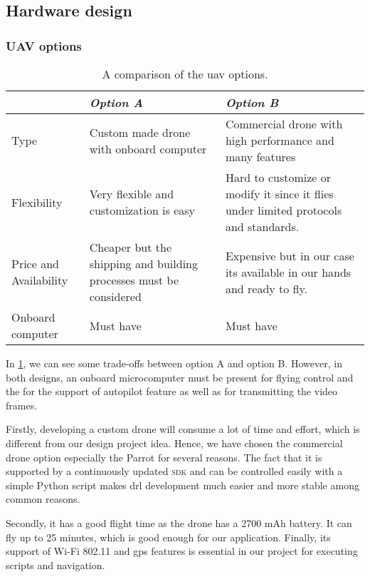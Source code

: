 \documentclass[../main.tex]{subfiles}
\begin{document}
\subsection{Hardware design}

\subsubsection{UAV options}

\begin{table}[tbp]
	\centering
	\caption{A comparison of the \gls{uav} options.}
	\label{tab:alt-solutions}
	\begin{tabularx}{\textwidth}{ p{4cm} X X }
		\toprule
		\textit{} & \textit{Option A} & \textit{Option B}\\ \midrule
		Type  & Custom made drone with onboard computer & 
		Commercial drone with high performance and many features    \\
		Flexibility & Very flexible and customization is easy & 
		Hard to customize or modify it since it flies under 
		limited protocols and standards. \\
		
		Price and Availability & Cheaper but the shipping and 
		building processes must be considered & Expensive but 
		in our case its available in our hands and ready to fly.   \\
		
		Onboard computer & Must have & Must have \\
		\bottomrule
	\end{tabularx}
\end{table} 

In \cref{tab:alt-solutions}, 
we can see some trade-offs 
between option A and option B. However, in both designs, 
an onboard microcomputer must be present for 
flying control and the for the support of autopilot feature as well as for 
transmitting the video frames. 


Firstly, developing a custom drone will consume a lot of time and effort, 
which is different from our design project idea.
Hence, we have chosen the commercial drone option especially 
the Parrot \anafi for several reasons.
The fact that it is supported by a continuously updated 
\textsc{sdk} and can be controlled easily 
with a simple Python script makes 
\gls{drl} development much easier and more stable among common reasons.

Secondly, it has a good flight time 
as the \anafi drone has a 2700 mAh battery. 
It can fly up to 25 minutes, which is good enough 
for our application.
Finally, its support of Wi-Fi 802.11 and \gls{gps} 
features is essential in our project for 
executing scripts and navigation.
\end{document}
